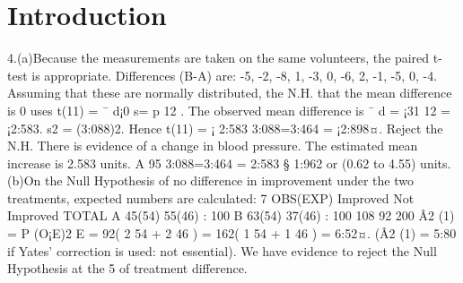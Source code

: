 \documentclass{article}
\begin{document}
\maketitle

\section{Introduction}


4.(a)Because the measurements are taken on the same volunteers, the paired t-test is appropriate.
Differences (B-A) are: -5, -2, -8, 1, -3, 0, -6, 2, -1, -5, 0, -4.
Assuming that these are normally distributed, the N.H. that the mean difference is 0
uses t(11) = ¯ d¡0
s=
p
12
.
The observed mean difference is ¯ d = ¡31
12 = ¡2:583. s2 = (3:088)2.
Hence t(11) = ¡ 2:583
3:088=3:464 = ¡2:898¤.
Reject the N.H. There is evidence of a change in blood pressure.
The estimated mean increase is 2.583 units. A 95%
3:088=3:464 = 2:583 § 1:962 or (0.62 to 4.55) units.
(b)On the Null Hypothesis of no difference in improvement under the two treatments, expected
numbers are calculated:
7
OBS(EXP) Improved Not Improved TOTAL
A 45(54) 55(46) : 100
B 63(54) 37(46) : 100
108 92 200
Â2
(1) =
P (O¡E)2
E = 92( 2
54 + 2
46 ) = 162( 1
54 + 1
46 ) = 6:52¤.
(Â2
(1) = 5:80 if Yates’ correction is used: not essential).
We have evidence to reject the Null Hypothesis at the 5%
of treatment difference.
\end{document}
